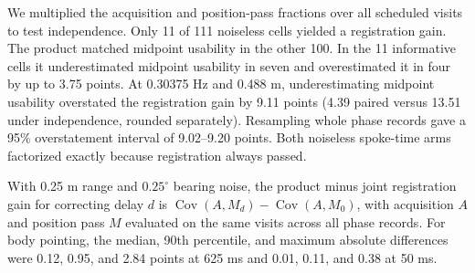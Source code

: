 We multiplied the acquisition and position-pass fractions over all scheduled visits to test independence. Only 11 of 111 noiseless cells yielded a registration gain. The product matched midpoint usability in the other 100. In the 11 informative cells it underestimated midpoint usability in seven and overestimated it in four by up to 3.75 points. At 0.30375 Hz and 0.488 m, underestimating midpoint usability overstated the registration gain by 9.11 points (4.39 paired versus 13.51 under independence, rounded separately). Resampling whole phase records gave a 95\% overstatement interval of 9.02--9.20 points. Both noiseless spoke-time arms factorized exactly because registration always passed.

With 0.25 m range and $0.25^\circ$ bearing noise, the product minus joint registration gain for correcting delay $d$ is $\operatorname{Cov}(A,M_d)-\operatorname{Cov}(A,M_0)$, with acquisition $A$ and position pass $M$ evaluated on the same visits across all phase records. For body pointing, the median, 90th percentile, and maximum absolute differences were 0.12, 0.95, and 2.84 points at 625 ms and 0.01, 0.11, and 0.38 at 50 ms.
